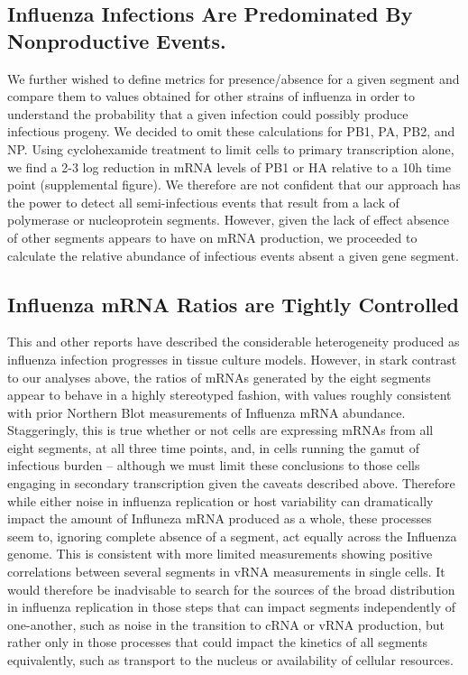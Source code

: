 \documentclass[9pt,lineno]{elife}
\begin{document}
\subsection{Influenza Infections Are Predominated By Nonproductive Events.}
	We further wished to define metrics for presence/absence for a given segment and compare them to values obtained for other strains of influenza in order to understand the probability that a given infection could possibly produce infectious progeny. We decided to omit these calculations for PB1, PA, PB2, and NP. Using cyclohexamide treatment to limit cells to primary transcription alone, we find a 2-3 log reduction in mRNA levels of PB1 or HA relative to a 10h time point (supplemental figure). We therefore are not confident that our approach has the power to detect all semi-infectious events that result from a lack of polymerase or nucleoprotein segments. However, given the lack of effect absence of other segments appears to have on mRNA production, we proceeded to calculate the relative abundance of infectious events absent a given gene segment. 

\subsection{Influenza mRNA Ratios are Tightly Controlled}
	
	This and other reports have described the considerable heterogeneity produced as influenza infection progresses in tissue culture models. However, in stark contrast to our analyses above, the ratios of mRNAs generated by the eight segments appear to behave in a highly stereotyped fashion, with values roughly consistent with prior Northern Blot measurements of Influenza mRNA abundance. Staggeringly, this is true whether or not cells are expressing mRNAs from all eight segments, at all three time points,  and, in cells running the gamut of infectious burden -- although we must limit these conclusions to those cells engaging in secondary transcription given the caveats described above. Therefore while either noise in influenza replication or host variability can dramatically impact the amount of Influneza mRNA produced as a whole, these processes seem to, ignoring complete absence of a segment, act equally across the Influenza genome. This is consistent with more limited measurements showing positive correlations between several segments in vRNA measurements in single cells. It would therefore be inadvisable to search for the sources of the broad distribution in influenza replication in those steps that can impact segments independently of one-another, such as noise in the transition to cRNA or vRNA production, but rather only in those processes that could impact the kinetics of all segments equivalently, such as transport to the nucleus or availability of cellular resources. 
\end{document}
